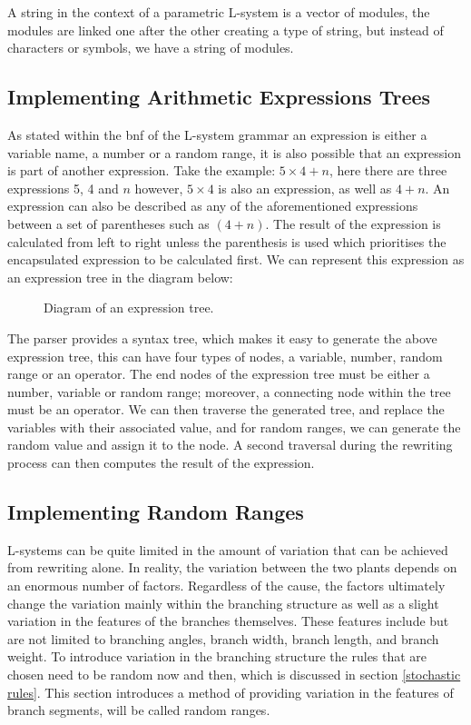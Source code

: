 A string in the context of a parametric L-system is a vector of modules, the modules are linked one after the other creating a type of string, but instead of characters or symbols, we have a string of modules.

\subsection{Implementing Arithmetic Expressions Trees} \label{expression tree}

As stated within the \acrshort{bnf} of the L-system grammar an expression is either a variable name, a number or a random range, it is also possible that an expression is part of another expression. Take the example: $5 \times 4 + n$, here there are three expressions 5, 4 and $n$ however, $5 \times 4$ is also an expression, as well as $4 + n$. An expression can also be described as any of the aforementioned expressions between a set of parentheses such as $(4+n)$. The result of the expression is calculated from left to right unless the parenthesis is used which prioritises the encapsulated expression to be calculated first. We can represent this expression as an expression tree in the diagram below:

\begin{figure}[htbp]
	{\centering
		\setlength{\fboxrule}{1pt}
		\vspace{7px}
		\caption{Diagram of an expression tree.} \label{3D rotations}
	}
\end{figure}
\FloatBarrier

\noindent
The parser provides a syntax tree, which makes it easy to generate the above expression tree, this can have four types of nodes, a variable, number, random range or an operator. The end nodes of the expression tree must be either a number, variable or random range; moreover, a connecting node within the tree must be an operator. We can then traverse the generated tree, and replace the variables with their associated value, and for random ranges, we can generate the random value and assign it to the node. A second traversal during the rewriting process can then computes the result of the expression. 

\subsection{Implementing Random Ranges}

L-systems can be quite limited in the amount of variation that can be achieved from rewriting alone. In reality, the variation between the two plants depends on an enormous number of factors. Regardless of the cause, the factors ultimately change the variation mainly within the branching structure as well as a slight variation in the features of the branches themselves. These features include but are not limited to branching angles, branch width, branch length, and branch weight. To introduce variation in the branching structure the rules that are chosen need to be random now and then, which is discussed in section \ref{stochastic rules}. This section introduces a method of providing variation in the features of branch segments, will be called random ranges. 


